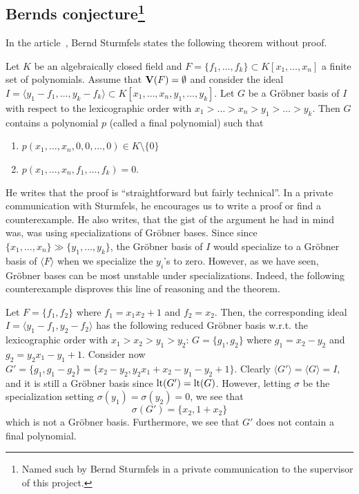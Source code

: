 \subsection[Bernds conjecture]{Bernds conjecture\footnote{Named such by Bernd Sturmfels in a private communication to the supervisor of this project.}}\label{sec:bernd}
In the article~\cite{sturmfels}, Bernd Sturmfels states the following theorem without proof.

\begin{theorem}
  Let $K$ be an algebraically closed field and $F = \{f_{1}, \dots, f_{k}\} \subset K[x_{1}, \dots, x_{n}]$ a finite set of polynomials. Assume that $\operatorname{\mathbf V}(F) = \emptyset$ and consider the ideal $I = \langle y_{1} - f_{1}, \dots, y_{k} - f_{k} \rangle \subset K[x_{1}, \dots, x_{n}, y_{1}, \dots, y_{k}]$. Let $G$ be a Gröbner basis of $I$ with respect to the lexicographic order with $x_{1} > \dots > x_{n} > y_{1} > \dots > y_{k}$. Then $G$ contains a polynomial $p$ (called a final polynomial) such that
  \begin{enumerate}
    \item $p(x_{1}, \dots, x_{n}, 0, 0, \dots, 0) \in K \setminus \{0\}$
    \item $p(x_{1}, \dots, x_{n}, f_{1}, \dots, f_{k}) = 0$.
  \end{enumerate}
\end{theorem}

He writes that the proof is ``straightforward but fairly technical''. In a private communication\cite{NL_to_BS} with Sturmfels, he encourages us to write a proof or find a counterexample. He also writes, that the gist of the argument he had in mind was, was using specializations of Gröbner bases. Since since $\{x_{1}, \dots, x_{n}\} \gg \{y_{1}, \dots, y_{k}\}$, the Gröbner basis of $I$ would specialize to a Gröbner basis of $\langle F \rangle$ when we specialize the $y_{i}$'s to zero. However, as we have seen, Gröbner bases can be most unstable under specializations. Indeed, the following counterexample disproves this line of reasoning and the theorem.

\begin{example}\upshape
  Let $F = \{f_{1}, f_{2}\}$ where $f_{1} = x_{1} x_{2} + 1$ and $f_{2} = x_{2}$. Then, the corresponding ideal
  $I = \langle y_{1} - f_{1}, y_{2} - f_{2} \rangle$ has the following reduced Gröbner basis w.r.t. the lexicographic order with $x_{1} > x_{2} > y_{1} > y_{2}$: $G =  \{g_{1}, g_{2}\}$ where $g_{1} = x_{2} - y_{2}$ and $ g_{2} = y_{2}x_{1} - y_{1} + 1$. Consider now $G' = \{g_{1}, g_{1} - g_{2}\} = \{x_{2} - y_{2}, y_{2}x_{1} + x_{2} - y_{1} - y_{2} + 1\}$. Clearly $\langle G' \rangle = \langle G \rangle = I$, and it is still a Gröbner basis since $\operatorname{lt}(G') = \operatorname{lt}(G)$. However, letting $\sigma$ be the specialization setting $\sigma(y_{1}) = \sigma(y_{2}) = 0$, we see that
  \[\sigma(G') = \{x_{2}, 1+x_{2}\}\]
  which is not a Gröbner basis. Furthermore, we see that $G'$ does not contain a final polynomial.
\end{example}

